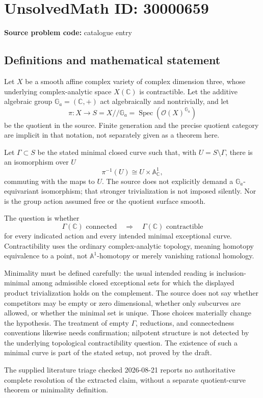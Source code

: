 \documentclass[11pt]{article}
\newcommand{\C}{\mathbb{C}}
\newcommand{\A}{\mathbb{A}}
\begin{document}
\section*{UnsolvedMath ID: 30000659}
\textbf{Source problem code:} catalogue entry
\subsection{Definitions and mathematical statement}
Let \(X\) be a smooth affine complex variety of complex dimension three, whose underlying complex-analytic space \(X(\C)\) is contractible. Let the additive algebraic group \(\mathbb G_a=(\C,+)\) act algebraically and nontrivially, and let
\[
\pi:X\longrightarrow S=X//\mathbb G_a
=\operatorname{Spec}(\mathcal O(X)^{\mathbb G_a})
\]
be the quotient in the source. Finite generation and the precise quotient category are implicit in that notation, not separately given as a theorem here.

Let \(\Gamma\subset S\) be the stated minimal closed curve such that, with \(U=S\setminus\Gamma\), there is an isomorphism over \(U\)
\[
\pi^{-1}(U)\cong U\times\A^1_\C,
\]
commuting with the maps to \(U\). The source does not explicitly demand a \(\mathbb G_a\)-equivariant isomorphism; that stronger trivialization is not imposed silently. Nor is the group action assumed free or the quotient surface smooth.

The question is whether
\[
\Gamma(\C)\text{ connected}\quad\Longrightarrow\quad
\Gamma(\C)\text{ contractible}
\]
for every indicated action and every intended minimal exceptional curve. Contractibility uses the ordinary complex-analytic topology, meaning homotopy equivalence to a point, not \(\A^1\)-homotopy or merely vanishing rational homology.

Minimality must be defined carefully: the usual intended reading is inclusion-minimal among admissible closed exceptional sets for which the displayed product trivialization holds on the complement. The source does not say whether competitors may be empty or zero dimensional, whether only subcurves are allowed, or whether the minimal set is unique. Those choices materially change the hypothesis. The treatment of empty \(\Gamma\), reductions, and connectedness conventions likewise needs confirmation; nilpotent structure is not detected by the underlying topological contractibility question. The existence of such a minimal curve is part of the stated setup, not proved by the draft.

The supplied literature triage checked 2026-08-21 reports no authoritative complete resolution of the extracted claim, without a separate quotient-curve theorem or minimality definition.
\end{document}
